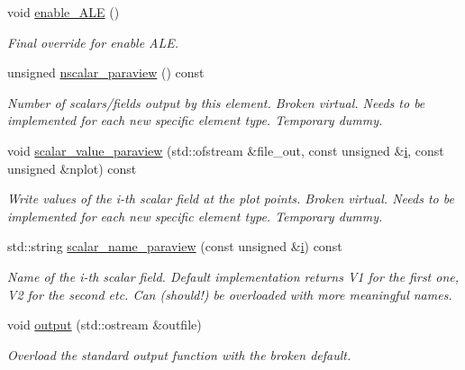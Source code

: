 \begin{DoxyCompactItemize}
void \hyperlink{classoomph_1_1RefineableBuoyantQCrouzeixRaviartElement_a7006ef1edd1ac4a178e38945fae581ee}{enable\+\_\+\+A\+LE} ()
\begin{DoxyCompactList}\small\item\em Final override for enable A\+LE. \end{DoxyCompactList}\item 
unsigned \hyperlink{classoomph_1_1RefineableBuoyantQCrouzeixRaviartElement_a2167093a1902a2ed4c79d45eff457ca8}{nscalar\+\_\+paraview} () const
\begin{DoxyCompactList}\small\item\em Number of scalars/fields output by this element. Broken virtual. Needs to be implemented for each new specific element type. Temporary dummy. \end{DoxyCompactList}\item 
void \hyperlink{classoomph_1_1RefineableBuoyantQCrouzeixRaviartElement_a9a8ee12b27daa327e97fbacc89c341c6}{scalar\+\_\+value\+\_\+paraview} (std\+::ofstream \&file\+\_\+out, const unsigned \&\hyperlink{cfortran_8h_adb50e893b86b3e55e751a42eab3cba82}{i}, const unsigned \&nplot) const
\begin{DoxyCompactList}\small\item\em Write values of the i-\/th scalar field at the plot points. Broken virtual. Needs to be implemented for each new specific element type. Temporary dummy. \end{DoxyCompactList}\item 
std\+::string \hyperlink{classoomph_1_1RefineableBuoyantQCrouzeixRaviartElement_ae9b9687a5a15a0089431ad1b143356e5}{scalar\+\_\+name\+\_\+paraview} (const unsigned \&\hyperlink{cfortran_8h_adb50e893b86b3e55e751a42eab3cba82}{i}) const
\begin{DoxyCompactList}\small\item\em Name of the i-\/th scalar field. Default implementation returns V1 for the first one, V2 for the second etc. Can (should!) be overloaded with more meaningful names. \end{DoxyCompactList}\item 
void \hyperlink{classoomph_1_1RefineableBuoyantQCrouzeixRaviartElement_abbe05b977edbfec7752ed417b90e09fa}{output} (std\+::ostream \&outfile)
\begin{DoxyCompactList}\small\item\em Overload the standard output function with the broken default. \end{DoxyCompactList}\item 

\end{DoxyCompactItemize}

